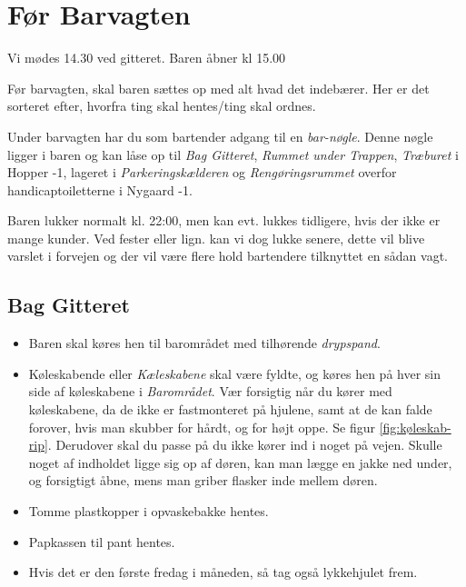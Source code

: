 \section{Før Barvagten}
\label{sec:pre-barvagten}

Vi mødes 14.30 ved gitteret. Baren åbner kl 15.00

Før barvagten, skal baren sættes op med alt hvad det indebærer. Her er
det sorteret efter, hvorfra ting skal hentes/ting skal ordnes.

Under barvagten har du som bartender adgang til en \textit{bar-nøgle}.
Denne nøgle ligger i baren og kan låse op til \textit{Bag Gitteret},
\textit{Rummet under Trappen}, \textit{Træburet} i Hopper -1,
lageret i \textit{Parkeringskælderen} og
\textit{Rengøringsrummet} overfor handicaptoiletterne i Nygaard -1.

Baren lukker normalt kl. 22:00, men kan evt. lukkes tidligere, hvis der ikke er mange kunder.
Ved fester eller lign. kan vi dog lukke senere, dette vil blive varslet i forvejen og der vil
være flere hold bartendere tilknyttet en sådan vagt.

\subsection{Bag Gitteret}
\label{sec:pre:bag-ved-gitteret}

\begin{itemize}
	\item Baren skal køres hen til barområdet med tilhørende \textit{drypspand}.
	\item Køleskabende eller \textit{Kæleskabene} skal være fyldte, og køres hen på hver sin side af køleskabene i
	\textit{Barområdet}. Vær forsigtig når du kører med køleskabene, da de ikke er fastmonteret på hjulene,
	samt at de kan falde forover, hvis man skubber for hårdt, og for højt oppe. Se figur \ref{fig:køleskab-rip}. Derudover skal
	du passe på du ikke kører ind i noget på vejen. Skulle noget af indholdet ligge sig op af døren, kan man lægge en jakke
	ned under, og forsigtigt åbne, mens man griber flasker inde mellem døren.
	\item Tomme plastkopper i opvaskebakke hentes.
	\item Papkassen til pant hentes.
	\item Hvis det er den første fredag i måneden, så tag også lykkehjulet frem.
\end{itemize}

